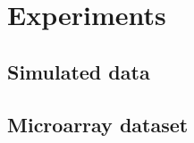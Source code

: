 \section{Experiments}
\label{experiments}

\subsection{Simulated data}

\subsection{Microarray dataset}